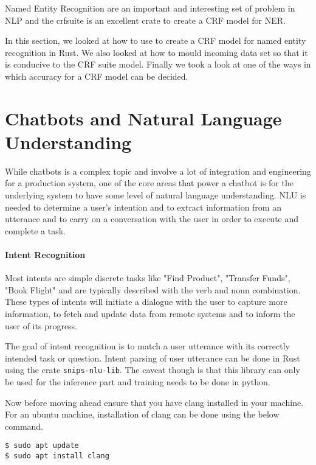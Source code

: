 \documentclass{book}
\begin{document}
Named Entity Recognition are an important and interesting set of problem in NLP and the crfsuite is an excellent crate to create a CRF model for NER.

In this section, we looked at how to use to create a CRF model for named entity recognition in Rust. We also looked at how to mould incoming data set so that it is conducive to the CRF suite model. Finally we took a look at one of the ways in which accuracy for a CRF model can be decided.

\label{sec:Named Entity Recognition}

\section{Chatbots and Natural Language Understanding}%
While chatbots is a complex topic and involve a lot of integration and engineering for a production system, one of the core areas that power a chatbot is for the underlying system to have some level of natural language understanding. NLU is needed to determine a user's intention and to extract information from an utterance and to carry on a conversation with the user in order to execute and complete a task.

\paragraph{Intent Recognition}%
Most intents are simple discrete tasks like "Find Product", "Transfer Funds", "Book Flight" and are typically described with the verb and noun combination. These types of intents will initiate a dialogue with the user to capture more information, to fetch and update data from remote systems and to inform the user of its progress.

The goal of intent recognition is to match a user utterance with its correctly intended task or question. Intent parsing of user utterance can be done in Rust using the crate \lstinline{snips-nlu-lib}. The caveat though is that this library can only be used for the inference part and training needs to be done in python.
\label{par:intent_recognition}

Now before moving ahead ensure that you have clang installed in your machine. For an ubuntu machine, installation of clang can be done using the below command.

\begin{lstlisting}[caption={}]
$ sudo apt update
$ sudo apt install clang
\end{lstlisting}
\end{document}
